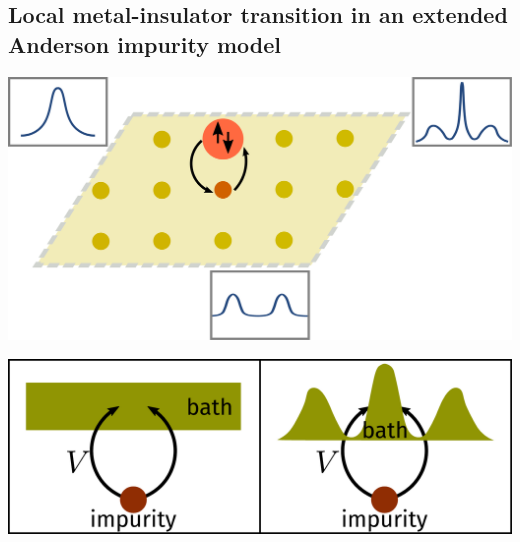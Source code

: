 \documentclass[10pt,aspectratio=169]{beamer}
\begin{document}
\begin{frame}{}
\section{Local metal-insulator transition in an extended Anderson impurity model}
\vspace*{\fill}

\begin{minipage}{0.5\textwidth}
\includegraphics[width=\textwidth]{DMFT.pdf}
\end{minipage}
\hspace*{\fill}
\begin{minipage}{0.45\textwidth}
\includegraphics[width=\textwidth]{dos_diff.pdf}
\end{minipage}

\end{frame}
\end{document}
